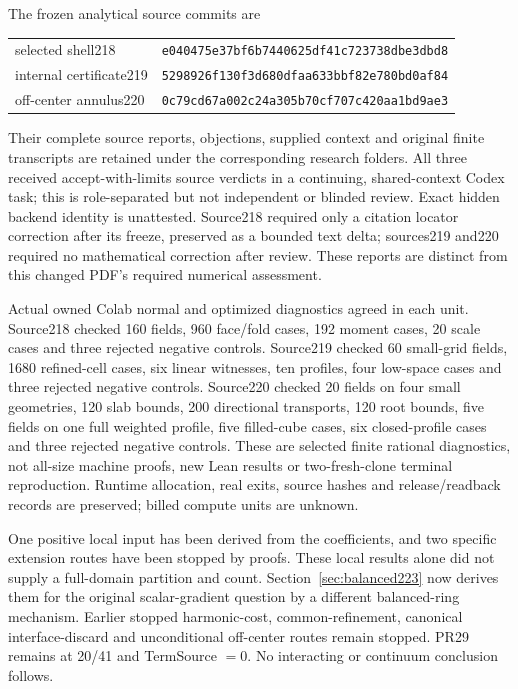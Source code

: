 The frozen analytical source commits are
\begin{center}\scriptsize
\begin{tabular}{ll}
selected shell218 & \texttt{e040475e37bf6b7440625df41c723738dbe3dbd8}\\
internal certificate219 & \texttt{5298926f130f3d680dfaa633bbf82e780bd0af84}\\
off-center annulus220 & \texttt{0c79cd67a002c24a305b70cf707c420aa1bd9ae3}
\end{tabular}
\end{center}
Their complete source reports, objections, supplied context and original
finite transcripts are retained under the corresponding research folders.
All three received accept-with-limits source verdicts in a continuing,
shared-context Codex task; this is role-separated but not independent or
blinded review. Exact hidden backend identity is unattested. Source218
required only a citation locator correction after its freeze, preserved
as a bounded text delta; sources219 and220 required no mathematical
correction after review. These reports are distinct from this changed
PDF's required numerical assessment.

Actual owned Colab normal and optimized diagnostics agreed in each unit.
Source218 checked 160 fields, 960 face/fold cases, 192 moment cases,
20 scale cases and three rejected negative controls. Source219 checked
60 small-grid fields, 1680 refined-cell cases, six linear witnesses,
ten profiles, four low-space cases and three rejected negative controls.
Source220 checked 20 fields on four small geometries, 120 slab bounds,
200 directional transports, 120 root bounds, five fields on one full
weighted profile, five filled-cube cases, six closed-profile cases and
three rejected negative controls. These are selected finite rational
diagnostics, not all-size machine proofs, new Lean results or two-fresh-clone
terminal reproduction. Runtime allocation, real exits, source hashes and
release/readback records are preserved; billed compute units are unknown.

One positive local input has been derived from the coefficients, and two
specific extension routes have been stopped by proofs. These local results
alone did not supply a full-domain partition and count. Section~\ref{sec:balanced223}
now derives them for the original scalar-gradient question by a different
balanced-ring mechanism. Earlier stopped harmonic-cost, common-refinement,
canonical interface-discard and unconditional off-center routes remain stopped. PR29 remains at 20/41 and
TermSource $=0$. No interacting or continuum conclusion follows.
